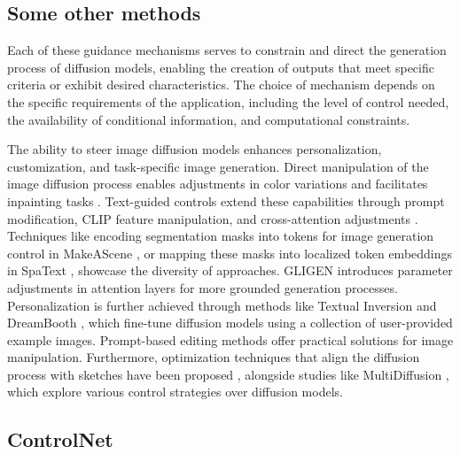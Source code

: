 \subsection{Some other methods}
Each of these guidance mechanisms serves to constrain and direct the generation process of diffusion models, enabling the creation of outputs that meet specific criteria or exhibit desired characteristics. The choice of mechanism depends on the specific requirements of the application, including the level of control needed, the availability of conditional information, and computational constraints.


The ability to steer image diffusion models enhances personalization, customization, and task-specific image generation. Direct manipulation of the image diffusion process enables adjustments in color variations \cite{sdedit2021} and facilitates inpainting tasks \cite{blended2022}. Text-guided controls extend these capabilities through prompt modification, CLIP feature manipulation, and cross-attention adjustments \cite{makeascene2022, spatext2022, gligen2023, textualinversion2022, dreambooth2022, promptedit2022}. Techniques like encoding segmentation masks into tokens for image generation control in MakeAScene \cite{makeascene2022}, or mapping these masks into localized token embeddings in SpaText \cite{spatext2022}, showcase the diversity of approaches. GLIGEN \cite{gligen2023} introduces parameter adjustments in attention layers for more grounded generation processes. Personalization is further achieved through methods like Textual Inversion \cite{textualinversion2022} and DreamBooth \cite{dreambooth}, which fine-tune diffusion models using a collection of user-provided example images. Prompt-based editing methods \cite{promptedit2022} offer practical solutions for image manipulation. Furthermore, optimization techniques that align the diffusion process with sketches have been proposed \cite{sketchdiffusion2022}, alongside studies like MultiDiffusion \cite{multidiffusion2023}, which explore various control strategies over diffusion models.

\subsection{ControlNet}

